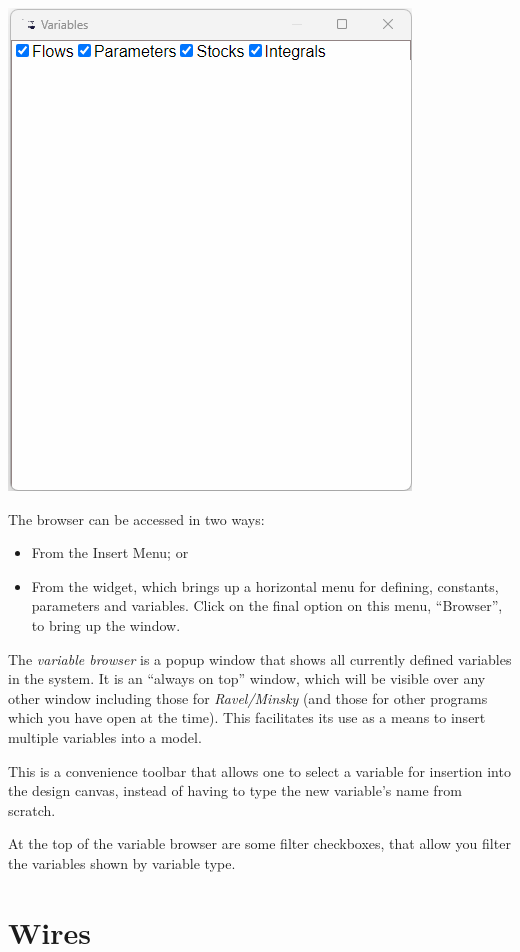 \includegraphics{images/browserWindow}

The browser can be accessed in two ways:
\begin{itemize}
\item From the Insert Menu; or 
\item From the  widget, which brings up a horizontal
menu for defining, constants, parameters and variables. Click on the
final option on this menu, ``Browser'', to bring up the window. 
\end{itemize}
The \emph{variable browser} is a popup window that shows all currently
defined variables in the system. It is an ``always on top'' window,
which will be visible over any other window including those for \emph{Ravel/Minsky}
(and those for other programs which you have open at the time). This
facilitates its use as a means to insert multiple variables into a
model.

This is a convenience toolbar that allows one to select a variable
for insertion into the design canvas, instead of having to type the
new variable's name from scratch.

At the top of the variable browser are some filter checkboxes, that
allow you filter the variables shown by variable type.

\section{Wires}

